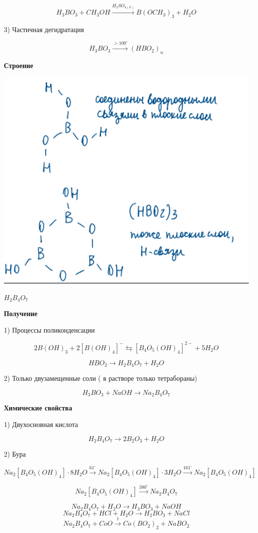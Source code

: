 \documentclass[14pt,a4paper]{scrartcl}
\begin{document}
$$H_3BO_3 + CH_3OH \xrightarrow{H_2SO_{4(k)}} B(OCH_3)_3 + H_2O$$

3) Частичная дегидратация

$$H_3BO_3 \xrightarrow{>100^{\circ}} (HBO_2)_n$$

\textbf{Строение}

\includegraphics{11v6.png}


$H_2B_4O_7$

\textbf{Получение}

1)  Процессы поликонденсации

$$2B(OH)_3 + 2[B(OH)_4]^- \leftrightarrows [B_4O_5(OH)_4]^{2-} + 5H_2O$$

$$HBO_2 \rightarrow H_2B_4O_7 + H_2O$$

2) Только двузамещенные соли ( в растворе только тетрабораны)

$$H_3BO_3 + NaOH \rightarrow Na_2B_4O_7$$

\textbf{Химические свойства}

1) Двухосновная кислота

$$H_2B_4O_7 \rightarrow 2B_2O_3 + H_2O$$

2) Бура

$$Na_2[B_4O_5(OH)_4]\cdot 8H_2O \xrightarrow{61^{\circ}} Na_2[B_4O_5(OH)_4]\cdot 3H_2O \xrightarrow{161^{\circ}} Na_2[B_4O_5(OH)_4]$$

$$Na_2[B_4O_5(OH)_4] \xrightarrow{380^{\circ}} Na_2B_4O_7$$

$$Na_2B_4O_7 + H_2O \rightarrow H_3BO_3 + NaOH$$
$$Na_2B_4O_7 + HCl + H_2O \rightarrow H_2BO_3 + NaCl$$
$$Na_2B_4O_7 + CoO \xrightarrow{t} Co(BO_2)_2 + NaBO_2$$
\end{document}

